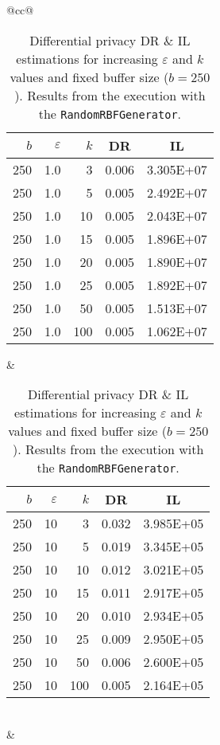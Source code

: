 \begin{table}[H]
\begin{tabular}{@{}cc@{}}
		\begin{tabular}{@{}rrrrr@{}}
			\toprule
			$b$ & $\varepsilon$ & $k$ & \multicolumn{1}{c}{DR} & \multicolumn{1}{c}{IL} \\ \midrule
			250 & 1.0 & 3   & 0.006 & 3.305E+07 \\
			250 & 1.0 & 5   & 0.005 & 2.492E+07 \\
			250 & 1.0 & 10  & 0.005 & 2.043E+07 \\
			250 & 1.0 & 15  & 0.005 & 1.896E+07 \\
			250 & 1.0 & 20  & 0.005 & 1.890E+07 \\
			250 & 1.0 & 25  & 0.005 & 1.892E+07 \\
			250 & 1.0 & 50  & 0.005 & 1.513E+07 \\
			250 & 1.0 & 100 & 0.005 & 1.062E+07 \\ \bottomrule
		\end{tabular}
		&
		\begin{tabular}{@{}rrrrr@{}}
			\toprule
			$b$ & $\varepsilon$ & $k$ & \multicolumn{1}{c}{DR} & \multicolumn{1}{c}{IL} \\ \midrule
			250 & 10 & 3   & 0.032 & 3.985E+05 \\
			250 & 10 & 5   & 0.019 & 3.345E+05 \\
			250 & 10 & 10  & 0.012 & 3.021E+05 \\
			250 & 10 & 15  & 0.011 & 2.917E+05 \\
			250 & 10 & 20  & 0.010 & 2.934E+05 \\
			250 & 10 & 25  & 0.009 & 2.950E+05 \\
			250 & 10 & 50  & 0.006 & 2.600E+05 \\
			250 & 10 & 100 & 0.005 & 2.164E+05 \\ \bottomrule
		\end{tabular}
		\\ & \\
	\end{tabular}
	\caption[Differential privacy DR \& IL estimations.]{Differential privacy DR \& IL estimations for increasing $\varepsilon$ and $k$ values and fixed buffer size ($b = 250$). Results from the execution with the \texttt{RandomRBFGenerator}.}
	\label{table:results-random-diff-priv}
\end{table}